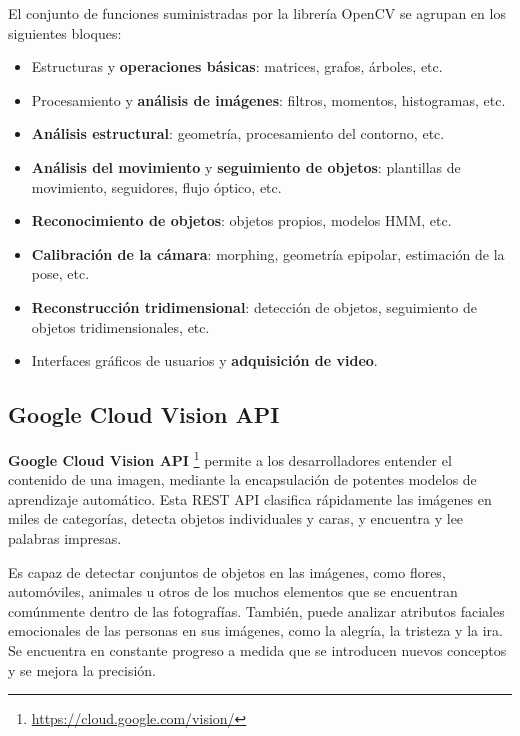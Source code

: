 El  conjunto  de  funciones   suministradas por la librería OpenCV se agrupan en los siguientes bloques: 
\begin{itemize}
\item Estructuras y \textbf{operaciones básicas}: matrices, grafos, árboles, etc.
\item Procesamiento y \textbf{análisis de imágenes}: filtros, momentos, histogramas, etc.
\item \textbf{Análisis estructural}: geometría, procesamiento del contorno, etc.
\item \textbf{Análisis del movimiento} y \textbf{seguimiento de objetos}: plantillas  de  movimiento, seguidores, flujo óptico, etc.
\item \textbf{Reconocimiento de objetos}: objetos propios, modelos \acs{HMM}, etc.
\item \textbf{Calibración de la cámara}: morphing, geometría epipolar, estimación de la pose, etc.
\item \textbf{Reconstrucción tridimensional}: detección de objetos, seguimiento de objetos tridimensionales, etc.
\item Interfaces gráficos de usuarios y \textbf{adquisición de video}.
\end{itemize}

\subsection{Google Cloud Vision API}
\label{sec:visionapi}

\textbf{Google Cloud Vision API} \footnote{\url{https://cloud.google.com/vision/}} permite a los desarrolladores entender el contenido de una imagen, mediante la encapsulación de potentes modelos de aprendizaje automático. Esta REST API clasifica rápidamente las imágenes en miles de categorías, detecta objetos individuales y caras, y encuentra y lee palabras impresas.

Es capaz de detectar conjuntos de objetos en las imágenes, como flores, automóviles, animales u otros de los muchos elementos 
que se encuentran comúnmente dentro de las fotografías. También, puede analizar atributos faciales emocionales de las personas en sus imágenes, como la alegría, la tristeza y la ira. Se encuentra en constante progreso a medida que se introducen nuevos conceptos y se mejora la precisión.

